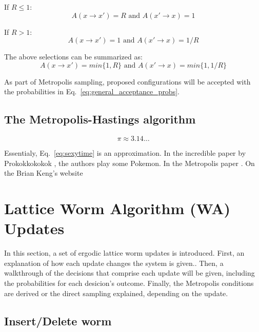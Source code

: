 \documentclass[12pt, two sided]{article}
\begin{document}
If $R \leq 1$:
%
\begin{equation} 
A(x \to x' ) = R \text{ and } A(x' \to x) = 1 \nonumber
\end{equation}
%

If $R > 1$: 
\begin{equation}
A(x \to x' ) = 1 \text{ and } A(x' \to x) = 1/R \nonumber
\end{equation}

The above selections can be summarized as:
%
\begin{equation}
\label{eq:general_acceptance_probs}
A(x \to x') = min\{1,R\} \text{ and } A(x' \to x) = min\{1,1/R\}
\end{equation}
%

As part of Metropolis sampling, proposed configurations will be accepted with the probabilities in Eq.~\eqref{eq:general_acceptance_probs}.

\subsection{The Metropolis-Hastings algorithm}

\begin{equation}
\label{eq:sexytime}
\pi \approx 3.14\dots
\end{equation}

Essentialy, Eq.~\eqref{eq:sexytime} is an approximation. In the incredible paper by Prokokkokokok \cite{Prokof_ev_1998}, the authors play some Pokemon. In the Metropolis paper \cite{doi:10.1063/1.1699114}. On the Brian Keng's website \cite{bkeng.metropolis}

\section{Lattice Worm Algorithm (WA) Updates}

In this section, a set of ergodic lattice worm updates is introduced. First, an explanation of how each update changes the system is given.. Then, a walkthrough of the decisions that comprise each update will be given, including the probabilities for each desicion's outcome. Finally, the Metropolis conditions are derived or the direct sampling explained, depending on the update.

	\subsection{Insert/Delete worm}
        
\end{document}
